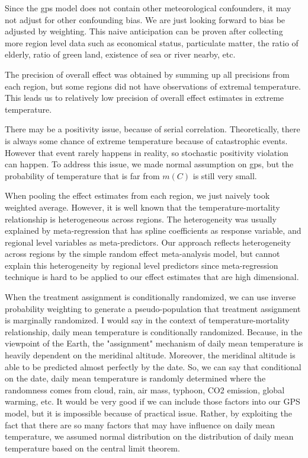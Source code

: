\documentclass[12pt]{article}
\begin{document}
Since the gps model does not contain other meteorological confounders,
it may not adjust for other confounding bias.
We are just looking forward to bias be adjusted by weighting.
This naive anticipation can be proven after collecting more region level data
such as economical status, particulate matter, the ratio of elderly, 
ratio of green land, existence of sea or river nearby, etc.

The precision of overall effect was obtained by summing up all precisions from each region,
but some regions did not have observations of extremal temperature.
This leads us to relatively low precision of overall effect estimates in extreme temperature.

There may be a positivity issue, because of serial correlation.
Theoretically, there is always some chance of extreme temperature because of catastrophic events.
However that event rarely happens in reality, 
so stochastic positivity violation\cite{zivich2022} can happen.
To address this issue, we made normal assumption on gps,
but the probability of temperature that is far from $m(C)$ is still very small.

When pooling the effect estimates from each region, we just naively took weighted average.
However, it is well known that the temperature-mortality relationship is heterogeneous across regions.
The heterogeneity was usually explained by meta-regression
that has spline coefficients as response variable, and regional level variables as meta-predictors.
Our approach reflects heterogeneity across regions by the simple random effect meta-analysis model, 
but cannot explain this heterogeneity by regional level predictors
since meta-regression technique is hard to be applied to our effect estimates that are high dimensional.

When the treatment assignment is conditionally randomized, 
we can use inverse probability weighting to generate a pseudo-population
that treatment assignment is marginally randomized.
I would say in the context of temperature-mortality relationship,
daily mean temperature is conditionally randomized.
Because, in the viewpoint of the Earth, 
the "assignment" mechanism of daily mean temperature is heavily dependent on the meridinal altitude.
Moreover, the meridinal altitude is able to be predicted almost perfectly by the date.
So, we can say that conditional on the date, daily mean temperature is randomly determined
where the randomness comes from cloud, rain, air mass, typhoon, CO2 emission, global warming, etc.
It would be very good if we can include those factors into our GPS model,
but it is impossible because of practical issue.
Rather, by exploiting the fact that 
there are so many factors that may have influence on daily mean temperature,
we assumed normal distribution on the distribution of daily mean temperature 
based on the central limit theorem.
\end{document}
